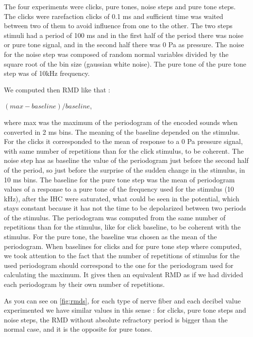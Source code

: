 The four experiments were clicks, pure tones, noise steps and pure tone steps.
The clicks were rarefaction clicks of 0.1 ms and sufficient time was waited between 
two of them to avoid influence from one to the other.
The two steps stimuli had a period of 100 ms and in the first half of the period 
there was noise or pure tone signal, and in the second half there was 0 Pa as pressure.
The noise for the noise step was composed of random normal variables divided 
by the square root of the bin size (gaussian white noise).
The pure tone of the pure tone step was of 10kHz frequency.

We computed then RMD like that : 

$(max - baseline) / baseline$,

where max was 
the maximum of the periodogram of the encoded sounds when converted in 2 ms bins.
The meaning of the baseline depended on the stimulus. 
For the clicks it corresponded to the mean of response to a 0 Pa pressure signal,
 with same number of repetitions than for the click stimulus, to be coherent. 
The noise step has as baseline the value of the periodogram just before the second 
half of the period, so just before the surprise of the sudden change in the stimulus,
 in 10 ms bins. 
The baseline for the pure tone step was the mean of periodogram values
of a response to a pure tone of the frequency used for the stimulus (10 kHz),
after the IHC were saturated, what could be seen in the potential, 
which stays constant because it has not the time 
to be depolarized between two periods of the stimulus. 
The periodogram was computed from the same number of repetitions than for the stimulus, 
like for click baseline, to be coherent with the stimulus.
For the pure tone, the baseline was chosen as the mean of the periodogram.
When baselines for clicks and for pure tone step where computed, 
we took attention to the fact that the number of repetitions of stimulus
for the used periodogram should correspond to the one for the periodogram used for 
calculating the maximum. 
It gives then an equivalent RMD as if we had divided each periodogram by 
their own number of repetitions.

As you can see on \autoref{fig:rmds}, for each type of nerve fiber and 
each decibel value experimented we have similar values in this sense :
for clicks, pure tone steps and noise steps, the RMD without absolute refractory
period is bigger than the normal case, and it is the opposite for pure tones.


